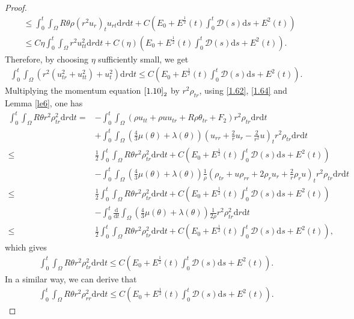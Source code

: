 \documentclass[11pt,reqno]{amsart}
\numberwithin{equation}{section}
\newcommand{\dif}{\mathrm{d}}
\newcommand{\intx}{\int_0^t \int_{\Omega} }
\begin{document}
\begin{proof}
\begin{align*}
&\le \intx R\theta \rho (r^2 u_r)_t u_{rt} \dif r \dif t +C(E_0+E^\frac{1}{2}(t) \int_0^t  \mathcal D(s)\dif s+E^2(t))\\
&\le C \eta \intx r^2 u_{tt}^2 \dif r\dif t +C(\eta)(E_0+E^\frac{1}{2}(t) \int_0^t  \mathcal D(s)\dif s+E^2(t)).
\end{align*}
Therefore, by choosing $\eta$ sufficiently small, we get
\begin{align}\label{1.64}
\intx (r^2(u_{tr}^2+u_{tt}^2)+ u_t^2) \dif r \dif t \le C(E_0+E^\frac{1}{2}(t) \int_0^t  \mathcal D(s)\dif s+E^2(t)).
\end{align}
Multiplying the momentum equation $\eqref{1.10}_2$ by $r^2 \rho_{tr}$, using  \eqref{1.62}, \eqref{1.64} and Lemma \ref{le6}, one has
\begin{align*}
\intx R\theta r^2 \rho_{tr}^2 \dif r \dif t =&-\intx (\rho u_{tt}+\rho u u_{tr}+R \rho \theta_{tr}+F_2)r^2 \rho_{tr}\dif r \dif t\\
&+\intx (\frac{4}{3} \mu(\theta)+\lambda(\theta))\left(u_{rr}+\frac{2}{r} u_r-\frac{2}{r^2} u\right)_t r^2 \rho_{tr} \dif r \dif t\\
\le& \frac{1}{2} \intx R \theta r^2 \rho_{tr}^2\dif r \dif t +C(E_0+E^\frac{1}{2}(t) \int_0^t  \mathcal D(s)\dif s+E^2(t))\\
&-\intx \left(\frac{4}{3} \mu(\theta)+\lambda(\theta)\right) \frac{1}{\rho} (\rho_{tr}+u\rho_{rr}+2\rho_r u_r+\frac{2}{r} \rho_r u)_t r^2 \rho_{tr} \dif r \dif t \\
 \le& \frac{1}{2} \intx R \theta r^2 \rho_{tr}^2\dif r \dif t +C(E_0+E^\frac{1}{2}(t) \int_0^t  \mathcal D(s)\dif s+E^2(t))\\
&-\int_0^t \frac{\dif}{\dif t} \int_{\Omega} \left(\frac{4}{3} \mu(\theta)+\lambda(\theta)\right) \frac{1}{2\rho} r^2 \rho_{tr}^2 \dif r\dif t\\
\le& \frac{1}{2} \intx R \theta r^2 \rho_{tr}^2\dif r \dif t +C(E_0+E^\frac{1}{2}(t) \int_0^t  \mathcal D(s)\dif s+E^2(t)),
\end{align*}
which gives
\begin{align}\label{1.65}
\intx R \theta r^2 \rho_{tr}^2\dif r \dif t \le C(E_0+E^\frac{1}{2}(t) \int_0^t  \mathcal D(s)\dif s+E^2(t)).
\end{align}
In a similar way, we can derive that
\begin{align}\label{1.65b}
\intx R \theta r^2 \rho_{rr}^2\dif r \dif t \le C(E_0+E^\frac{1}{2}(t) \int_0^t  \mathcal D(s)\dif s+E^2(t)).
\end{align}
%

\end{proof}
\end{document}
